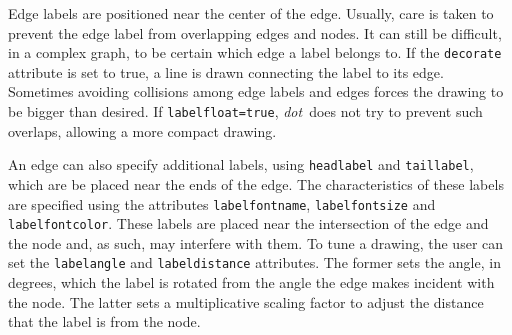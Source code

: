 \documentclass[11pt]{article}
\def\dot{{\it dot}}
\begin{document}
Edge labels are positioned near the center of the edge. Usually, care
is taken to prevent the edge label from overlapping edges and
nodes. It can still be difficult, in a complex graph, to be certain
which edge a label belongs to. If the {\tt decorate} attribute is set
to true, a line is drawn connecting the label to its edge. Sometimes
avoiding collisions among edge labels and edges forces the
drawing to be bigger than desired. If {\tt labelfloat=true}, 
\dot\ does not try to prevent such overlaps, allowing a more compact
drawing.

An edge can also specify additional labels, using {\tt headlabel} and
{\tt taillabel}, which are be placed near the ends of the edge.
The characteristics of these labels are specified using the attributes
{\tt labelfontname}, {\tt labelfontsize} and {\tt labelfontcolor}.
These labels are placed near the intersection of the edge and the node
and, as such, may interfere with them. To tune a drawing, the user can
set the {\tt labelangle} and {\tt labeldistance} attributes.
The former sets the angle, in degrees, which the label is rotated from 
the angle the edge makes incident with the node.
The latter sets a multiplicative scaling factor to adjust the distance
that the label is from the node.
\end{document}
